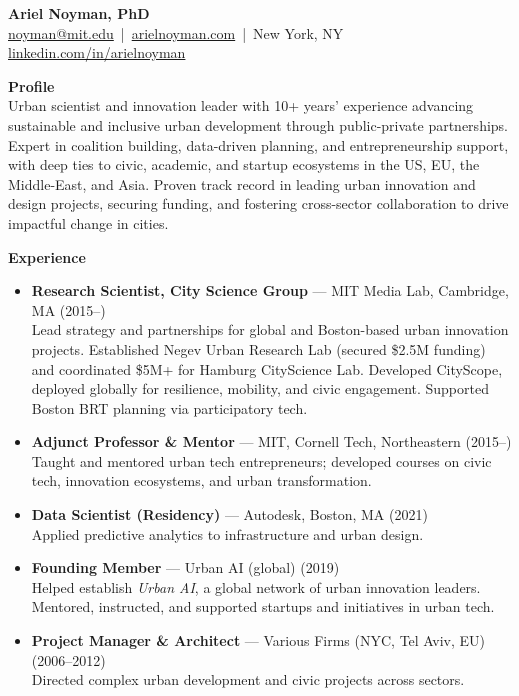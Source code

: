 \documentclass[a4paper,10pt]{article}
\begin{document}
\begin{center}
    {\LARGE \textbf{Ariel Noyman, PhD}} \\
    \href{mailto:noyman@mit.edu}{noyman@mit.edu} \,|\, \href{http://arielnoyman.com}{arielnoyman.com} \,|\, New York, NY \\
    \href{https://www.linkedin.com/in/arielnoyman}{linkedin.com/in/arielnoyman}
\end{center}


\vspace{2em}

\noindent \textbf{Profile} \\
Urban scientist and innovation leader with 10+ years’ experience advancing sustainable and inclusive urban development through public-private partnerships. Expert in coalition building, data-driven planning, and entrepreneurship support, with deep ties to civic, academic, and startup ecosystems in the US, EU, the Middle-East, and Asia. Proven track record in leading urban innovation and design projects, securing funding, and fostering cross-sector collaboration to drive impactful change in cities.



\vspace{2em}

\noindent \textbf{Experience}

\begin{itemize}[leftmargin=1.2em]
    \item \textbf{Research Scientist, City Science Group} — MIT Media Lab, Cambridge, MA (2015–) \\
          Lead strategy and partnerships for global and Boston-based urban innovation projects. Established Negev Urban Research Lab (secured \$2.5M funding) and coordinated \$5M+ for Hamburg CityScience Lab. Developed CityScope, deployed globally for resilience, mobility, and civic engagement. Supported Boston BRT planning via participatory tech.

    \item \textbf{Adjunct Professor \& Mentor} — MIT, Cornell Tech, Northeastern (2015–) \\
          Taught and mentored urban tech entrepreneurs; developed courses on civic tech, innovation ecosystems, and urban transformation.

    \item \textbf{Data Scientist (Residency)} — Autodesk, Boston, MA (2021) \\
          Applied predictive analytics to infrastructure and urban design.

    \item \textbf{Founding Member} — Urban AI (global) (2019) \\
          Helped establish \textit{Urban AI}, a global network of urban innovation leaders. Mentored, instructed, and supported startups and initiatives in urban tech.

    \item \textbf{Project Manager \& Architect} — Various Firms (NYC, Tel Aviv, EU) (2006–2012) \\
          Directed complex urban development and civic projects across sectors.
\end{itemize}
\end{document}
